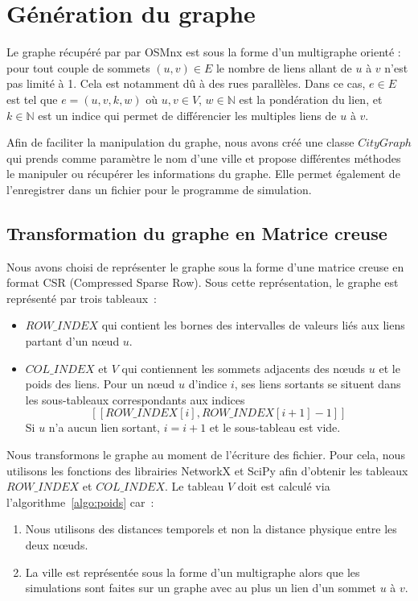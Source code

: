 \section{Génération du graphe}\label{sec:graphe}
Le graphe récupéré par par OSMnx est sous la forme d'un multigraphe orienté : pour tout couple de sommets $(u,v)\in E$ le nombre de liens allant de $u$ à $v$ n'est pas limité à 1. Cela est notamment dû à des rues parallèles. Dans ce cas, $e\in E$ est tel que $e=(u,v,k,w)$ où $u,v\in V$, $w\in\mathbb{N}$ est la pondération du lien, et $k\in\mathbb{N}$ est un indice qui permet de différencier les multiples liens de $u$ à $v$.
	
Afin de faciliter la manipulation du graphe, nous avons créé une classe $CityGraph$ qui prends comme paramètre le nom d'une ville et propose différentes méthodes le manipuler ou récupérer les informations du graphe. Elle permet également de l'enregistrer dans un fichier pour le programme de simulation. %

\subsection{Transformation du graphe en Matrice creuse}
Nous avons choisi de représenter le graphe sous la forme d'une matrice creuse en format CSR (Compressed Sparse Row). Sous cette représentation, le graphe est représenté par trois tableaux~: %
\begin{itemize}
	\item $ROW\_INDEX$ qui contient les bornes des intervalles de valeurs liés aux liens partant d'un nœud $u$.
	\item $COL\_INDEX$ et $V$ qui contiennent les sommets adjacents des nœuds $u$ et le poids des liens. Pour un nœud $u$ d'indice $i$, ses liens sortants se situent dans les sous-tableaux correspondants aux indices
	\[[\![ROW\_INDEX[i],ROW\_INDEX[i+1]-1]\!]\]
	Si $u$ n'a aucun lien sortant, $i=i+1$ et le sous-tableau est vide.
\end{itemize}
Nous transformons le graphe au moment de l'écriture des fichier. Pour cela, nous utilisons les fonctions des librairies NetworkX et SciPy %
	afin d'obtenir les tableaux $ROW\_INDEX$ et $COL\_INDEX$. Le tableau $V$ doit est calculé via l'algorithme~\ref{algo:poids} car~: \begin{enumerate}
	\item Nous utilisons des distances temporels et non la distance physique entre les deux nœuds. %
	\item La ville est représentée sous la forme d'un multigraphe alors que les simulations sont faites sur un graphe avec au plus un lien d'un sommet $u$ à $v$.
\end{enumerate}

